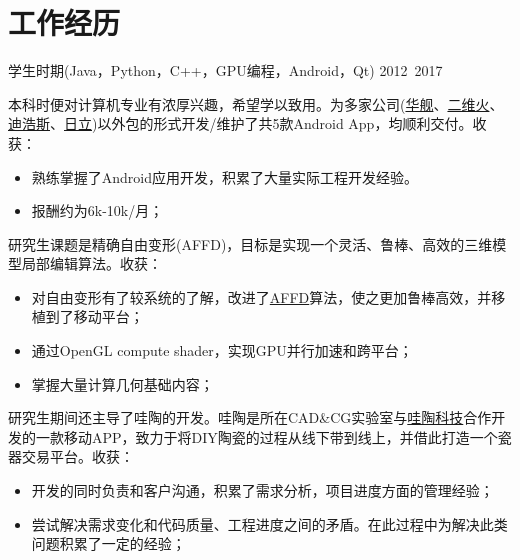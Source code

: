 \documentclass[]{friggeri-cv_cn} %
\begin{document}
\section{工作经历}
\begin{entrylist}
\entry
{学生时期(Java，Python，C++，GPU编程，Android，Qt)}
{2012~2017}
{本科时便对计算机专业有浓厚兴趣，希望学以致用。为多家公司(\href{http://www.hjtechcn.cn/}{华舰}、\href{http://www.2dfire.com/}{二维火}、\href{http://d-controls.com/}{迪浩斯}、\href{http://www.hisensehitachi.com/}{日立})以外包的形式开发/维护了共5款Android App，均顺利交付。收获：
\begin{itemize}
    \item 熟练掌握了Android应用开发，积累了大量实际工程开发经验。
    \item 报酬约为6k-10k/月；
\end{itemize}
  研究生课题是精确自由变形(AFFD)，目标是实现一个灵活、鲁棒、高效的三维模型局部编辑算法。收获：
\begin{itemize}
    \item 对自由变形有了较系统的了解，改进了\href{http://link.springer.com/article/10.1007/s11766-014-3239-6}{AFFD}算法，使之更加鲁棒高效，并移植到了移动平台；
    \item 通过OpenGL compute shader，实现GPU并行加速和跨平台；
    \item 掌握大量计算几何基础内容；
\end{itemize}
  研究生期间还主导了哇陶的开发。哇陶是所在CAD&CG实验室与\href{http://wowtao.me/index.html}{哇陶科技}合作开发的一款移动APP，致力于将DIY陶瓷的过程从线下带到线上，并借此打造一个瓷器交易平台。收获：
\begin{itemize}
    \item 开发的同时负责和客户沟通，积累了需求分析，项目进度方面的管理经验；
    \item 尝试解决需求变化和代码质量、工程进度之间的矛盾。在此过程中为解决此类问题积累了一定的经验；
\end{itemize} }



\end{entrylist}
\end{document}
